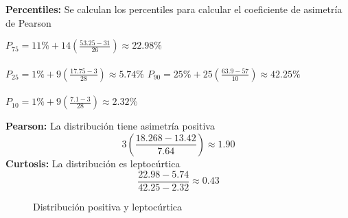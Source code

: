 \noindent\textbf{Percentiles:} Se calculan los percentiles para calcular el coeficiente de asimetría de Pearson

\begin{multicols}{2}
	\noindent$P_{75} = 11\% + 14\left(\frac{53.25 - 31}{26}\right) \approx 22.98\%$ \\ \\
	$P_{25} = 1\% + 9\left(\frac{17.75 - 3}{28}\right) \approx 5.74\%$
	\columnbreak
	\vfill
	\noindent$P_{90} = 25\% + 25\left(\frac{63.9 - 57}{10}\right) \approx 42.25\%$ \\ \\
	$P_{10} = 1\% + 9\left(\frac{7.1 - 3}{28}\right) \approx 2.32\%$
\end{multicols}

\begin{multicols}{2}
	\noindent\textbf{Pearson:} La distribución tiene asimetría positiva
	\begin{equation*}
		3\left(\frac{18.268-13.42}{7.64}\right) \approx 1.90
	\end{equation*}
	\vfill
	\columnbreak
	\noindent\textbf{Curtosis:} La distribución es leptocúrtica
	\begin{equation*}
		\frac{22.98-5.74}{42.25-2.32} \approx 0.43
	\end{equation*}
\end{multicols}

\begin{figure}[H]
	\centering
	\hspace*{-1.2cm}
	\caption{Distribución positiva y leptocúrtica}
\end{figure}

